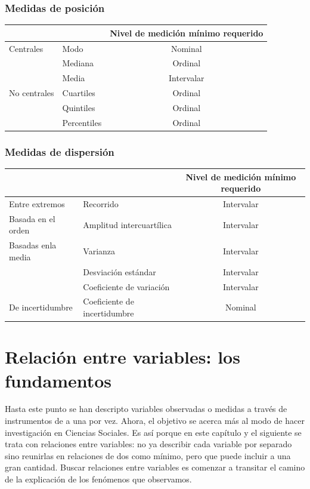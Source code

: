 \documentclass[]{book}
\begin{document}
\hypertarget{medidas-de-posicion-1}{%
\subsection{Medidas de posición}\label{medidas-de-posicion-1}}

\begin{longtable}[]{@{}llc@{}}
\toprule
& & Nivel de medición mínimo requerido\tabularnewline
\midrule
\endhead
Centrales & Modo & Nominal\tabularnewline
& Mediana & Ordinal\tabularnewline
& Media & Intervalar\tabularnewline
No centrales & Cuartiles & Ordinal\tabularnewline
& Quintiles & Ordinal\tabularnewline
& Percentiles & Ordinal\tabularnewline
\bottomrule
\end{longtable}

\hypertarget{medidas-de-dispersion-1}{%
\subsection{Medidas de dispersión}\label{medidas-de-dispersion-1}}

\begin{longtable}[]{@{}llc@{}}
\toprule
& & Nivel de medición mínimo requerido\tabularnewline
\midrule
\endhead
Entre extremos & Recorrido & Intervalar\tabularnewline
Basada en el orden & Amplitud intercuartílica & Intervalar\tabularnewline
Basadas enla media & Varianza & Intervalar\tabularnewline
& Desviación estándar & Intervalar\tabularnewline
& Coeficiente de variación & Intervalar\tabularnewline
De incertidumbre & Coeficiente de incertidumbre & Nominal\tabularnewline
\bottomrule
\end{longtable}

\hypertarget{relacion-entre-variables-los-fundamentos}{%
\chapter{Relación entre variables: los fundamentos}\label{relacion-entre-variables-los-fundamentos}}

Hasta este punto se han descripto variables observadas o medidas a
través de instrumentos de a una por vez. Ahora, el objetivo se acerca
más al modo de hacer investigación en Ciencias Sociales. Es así porque en este capítulo y el siguiente se trata con relaciones entre variables: no ya describir cada variable por separado sino reunirlas en
relaciones de dos como mínimo, pero que puede incluir a una gran
cantidad. Buscar relaciones entre variables es comenzar a transitar el camino de la explicación de los fenómenos que observamos.
\end{document}
